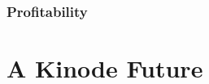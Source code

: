 \documentclass[runningheads]{llncs}
\begin{document}
\subsubsection{Profitability}


\section{A Kinode Future}
%
%
%
% 
% 
%
%
%
%
%
\end{document}

